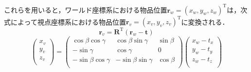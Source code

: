 これらを用いると，ワールド座標系における物品位置$ \bm{r}_w = \left( x_w, y_w, z_w \right)^{\mathrm{T}} $は，次式によって視点座標系における物品位置$ \bm{r}_v = \left( x_v, y_v, z_v \right)^{\mathrm{T}}$に変換される．
%
\begin{equation}
{
  \bm{r}_v
  = \bm{R}^{\mathrm{T}}\left(\bm{r}_w-\bm{t}\right)
}
\end{equation}
%
\begin{equation}
{
  \left(
    \begin{array}{c}
      x_v \\ y_v \\ z_v \\
    \end{array}
  \right)
  = \left(
    \begin{array}{ccc}
      \cos{\beta}\cos{\gamma} & \cos{\beta}\sin{\gamma} & \sin{\beta} \\
      -\sin{\gamma} & \cos{\gamma} & 0 \\
      -\sin{\beta}\cos{\gamma} & -\sin{\beta}\sin{\gamma} & \cos{\beta} \\
    \end{array}
  \right)
  \left(
    \begin{array}{c}
      x_w - t_x \\ y_w - t_y \\ z_w - t_z\\
    \end{array}
  \right)
}
\end{equation}
%
